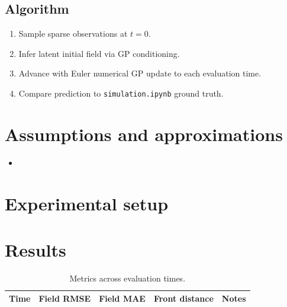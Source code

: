 \documentclass[11pt]{article}
\begin{document}
\subsection{Algorithm}

\begin{enumerate}
  \item Sample sparse observations at $t=0$.
  \item Infer latent initial field via GP conditioning.
  \item Advance with Euler numerical GP update to each evaluation time.
  \item Compare prediction to \texttt{simulation.ipynb} ground truth.
\end{enumerate}

\section{Assumptions and approximations}

\begin{itemize}
  \item %
\end{itemize}

\section{Experimental setup}


\section{Results}

\begin{table}[h]
  \centering
  \caption{Metrics across evaluation times.}
  \begin{tabular}{@{}rcccc@{}}
    \toprule
    Time & Field RMSE & Field MAE & Front distance & Notes \\
    \midrule
    \bottomrule
  \end{tabular}
\end{table}

\end{document}
